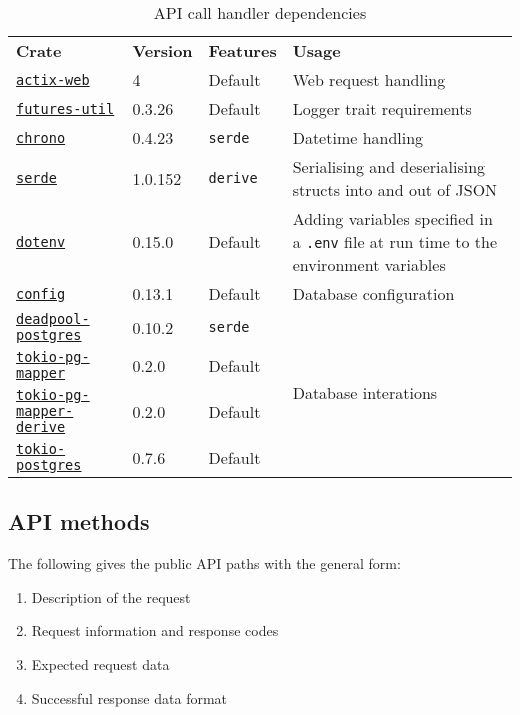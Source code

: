 \documentclass{../../Reports/custom}
\begin{document}
\begin{table}[h]
	\centering
	\begin{tabular}{|l|l|l|p{7cm}|}
	\hline
		\textbf{Crate} & \textbf{Version} & \textbf{Features} & \textbf{Usage} \\\Xhline{3\arrayrulewidth}
		\href{https://crates.io/crates/actix-web}{\texttt{actix-web}} & 4 & Default & Web request handling \\\hline
		\href{https://crates.io/crates/futures-util}{\texttt{futures-util}} & 0.3.26 & Default & Logger trait requirements \\\hline
		\href{https://crates.io/crates/chrono}{\texttt{chrono}} & 0.4.23 & \texttt{serde} & Datetime handling \\\hline
		\href{https://crates.io/crates/serde}{\texttt{serde}} & 1.0.152 & \texttt{derive} & Serialising and deserialising structs into and out of JSON \\\hline
		\href{https://crates.io/crates/dotenv}{\texttt{dotenv}} & 0.15.0 & Default & Adding variables specified in a \texttt{.env} file at run time to the environment variables \\\hline
		\href{https://crates.io/crates/config}{\texttt{config}} & 0.13.1 & Default & Database configuration \\\hline
		\href{https://crates.io/crates/deadpool-postgres}{\texttt{deadpool-postgres}} & 0.10.2 & \texttt{serde} & \multirow{4}{*}{Database interations} \\\cline{0-2}
		\href{https://crates.io/crates/tokio-pg-mapper}{\texttt{tokio-pg-mapper}} & 0.2.0 & Default &  \\\cline{0-2}
		\href{https://crates.io/crates/tokio-pg-mapper-derive}{\texttt{tokio-pg-mapper-derive}} & 0.2.0 & Default &  \\\cline{0-2}
		\href{https://crates.io/crates/tokio-postgres}{\texttt{tokio-postgres}} & 0.7.6 & Default &  \\\hline
	\end{tabular}
	\caption{API call handler dependencies}
\end{table}

\subsection{API methods}

The following gives the public API paths with the general form:
\begin{enumerate}
	\item Description of the request
	\item Request information and response codes
	\item Expected request data
	\item Successful response data format
\end{enumerate}
\end{document}
